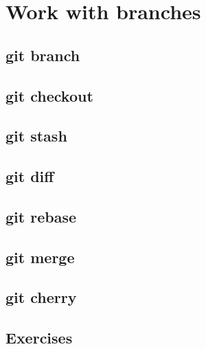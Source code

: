 \section{Work with branches}
\begin{frame}[fragile]
    \slidetitle
\end{frame}

\subsection{git branch}
\begin{frame}[fragile]
    \subslidetitle
\end{frame}

\subsection{git checkout}
\begin{frame}[fragile]
    \subslidetitle
\end{frame}

\subsection{git stash}
\begin{frame}[fragile]
    \subslidetitle
\end{frame}

\subsection{git diff}
\begin{frame}[fragile]
    \subslidetitle
\end{frame}

\subsection{git rebase}
\begin{frame}[fragile]
    \subslidetitle
\end{frame}

\subsection{git merge}
\begin{frame}[fragile]
    \subslidetitle
\end{frame}

\subsection{git cherry}
\begin{frame}[fragile]
    \subslidetitle
\end{frame}

\subsection{Exercises}
\begin{frame}[fragile]
  \subslidetitle
\end{frame}
